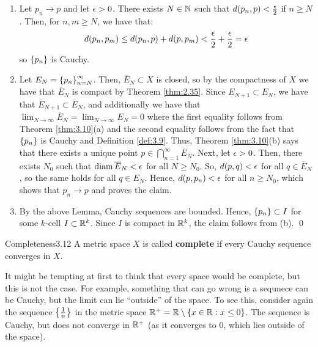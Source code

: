 \begin{nproof}
    \begin{enumerate}
        \item Let $p_n \rightarrow p$ and let $\epsilon > 0$. There exists $N \in \mathbb{N}$ such that $d(p_n, p) < \frac{\epsilon}{2}$ if $n \geq N$. Then, for $n, m \geq N$, we have that:
        \begin{align*}
            d(p_n, p_m) \leq d(p_n, p) + d(p, p_m) < \frac{\epsilon}{2} + \frac{\epsilon}{2} = \epsilon
        \end{align*}
        so $\set{p_n}$ is Cauchy.
        \item Let $E_N = \set{p_n}_{n = N}^{\infty}$. Then, $\overline{E}_N \subset X$ is closed, so by the compactness of $X$ we have that $\overline{E}_N$ is compact by Theorem \ref{thm:2.35}. Since $E_{N+1} \subset E_N$, we have that $\overline{E}_{N+1} \subset \overline{E}_N$, and additionally we have that $\lim_{N \rightarrow \infty} \overline{E}_N =\lim_{N \rightarrow \infty} E_N = 0$ where the first equality follows from Theorem \ref{thm:3.10}(a) and the second equality follows from the fact that $\set{p_n}$ is Cauchy and Definition \ref{def:3.9}. Thus, Theorem \ref{thm:3.10}(b) says that there exists a unique point $p \in \bigcap_{n=1}^\infty \overline{E}_N$. Next, let $\epsilon > 0$. Then, there exists $N_0$ such that $\operatorname{diam} \overline{E}_N < \epsilon$ for all $N \geq N_0$. So, $d(p, q) < \epsilon$ for all $q \in \overline{E}_N$, so the same holds for all $q \in E_N$. Hence, $d(p, p_n) < \epsilon$ for all $n \geq N_0$, which shows that $p_n \rightarrow p$ and proves the claim. 
        \item By the above Lemma, Cauchy sequences are bounded. Hence, $\set{p_n} \subset I$ for some $k$-cell $I \subset \mathbb{R}^k$. Since $I$ is compact in $\mathbb{R}^k$, the claim follows from (b). \qed
    \end{enumerate}
\end{nproof}

\begin{definition}{Completeness}{3.12}
    A metric space $X$ is called \textbf{complete} if every Cauchy sequence converges in $X$. 
\end{definition}
It might be tempting at first to think that every space would be complete, but this is not the case. For example, something that can go wrong is a sequnece can be Cauchy, but the limit can lie ``outside'' of the space. To see this, consider again the sequence $\set{\frac{1}{n}}$ in the metric space $\mathbb{R}^+ = \mathbb{R} \setminus \set{x \in \mathbb{R}: x \leq 0}$. The sequence is Cauchy, but does not converge in $\mathbb{R}^+$ (as it converges to 0, which lies outside of the space).

